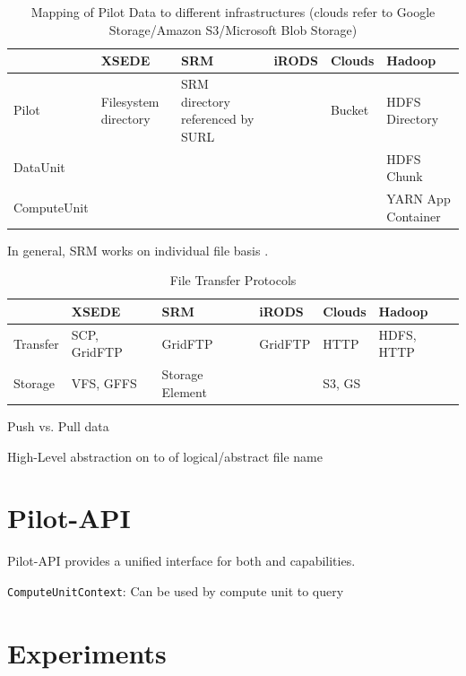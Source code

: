 \documentclass[conference]{IEEEtran}
\begin{document}
\begin{table}[t]
	\centering
\begin{tabular}{|p{1.3cm}|p{1cm}|p{1cm}|p{1cm}|p{1cm}|p{1cm}|}
	\hline
	&\textbf{XSEDE} &\textbf{SRM} &\textbf{iRODS} &\textbf{Clouds} &\textbf{Hadoop}\\
	\hline
Pilot &Filesystem directory &SRM directory referenced by SURL & &Bucket&HDFS Directory\\
	\hline
DataUnit &&&&&HDFS Chunk\\
ComputeUnit &&&&&YARN App Container\\
	\hline
\end{tabular}
\caption{Mapping of Pilot Data to different infrastructures (clouds refer to Google Storage/Amazon S3/Microsoft Blob Storage)}
\end{table}

In general, SRM works on individual file basis .


\begin{table}[ht]
\begin{tabular}{|p{1cm}|p{1cm}|p{1cm}|p{1cm}|p{1cm}|p{1cm}|}
		\hline
		&\textbf{XSEDE} &\textbf{SRM} &\textbf{iRODS} &\textbf{Clouds} &\textbf{Hadoop}\\
		\hline
		Transfer &SCP, GridFTP &GridFTP &GridFTP &HTTP &HDFS, HTTP\\
		\hline
		Storage &VFS, GFFS &Storage Element & &S3, GS &\\
		\hline
\end{tabular}
\caption{File Transfer Protocols}
\end{table}


Push vs. Pull data

High-Level abstraction on to of logical/abstract file name 





\section{Pilot-API}
Pilot-API provides a unified interface for both \pilotcompute and \pilotdata 
capabilities.


\texttt{ComputeUnitContext}: Can be used by compute unit to query 



\section{Experiments}
\end{document}
